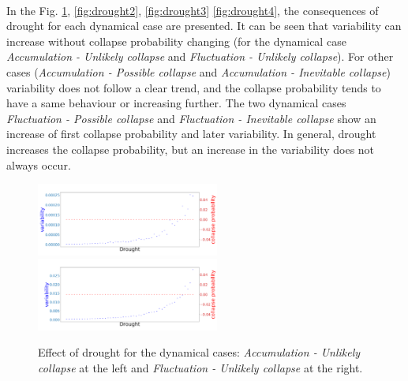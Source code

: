 \documentclass{article}
\begin{document}

\paragraph{}
In the Fig. \ref{fig:drought1}, \ref{fig:drought2}, \ref{fig:drought3} \ref{fig:drought4}, the consequences of drought for each dynamical case are presented. It can be seen that variability can increase without collapse probability changing (for the dynamical case \textit{Accumulation - Unlikely collapse} and \textit{Fluctuation - Unlikely collapse}). For other cases (\textit{Accumulation - Possible collapse} and \textit{Accumulation - Inevitable collapse}) variability does not follow a clear trend, and the collapse probability tends to have a same behaviour or increasing further. The two dynamical cases \textit{Fluctuation - Possible collapse} and \textit{Fluctuation - Inevitable collapse} show an increase of first collapse probability and later variability. In general, drought increases the collapse probability, but an increase in the variability does not always occur.


\begin{figure}[h]
\begin{center}
\includegraphics[width=6cm]{results/drought/return_never.png}
\includegraphics[width=6cm]{results/drought/equivalent_never.png}
\end{center}
\caption{\label{fig:temp}Effect of drought for the dynamical cases: \textit{Accumulation - Unlikely collapse} at the left and \textit{Fluctuation - Unlikely collapse} at the right.
\label{fig:drought1}} 
\end{figure}
\end{document}
